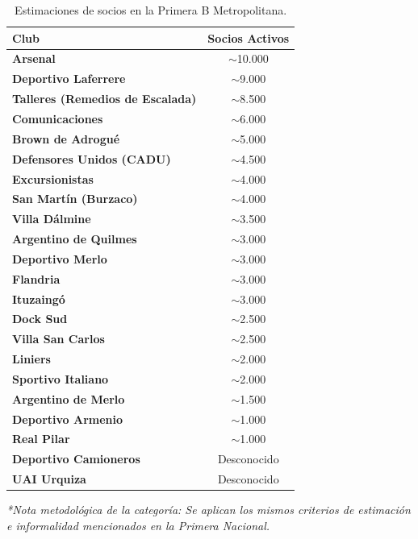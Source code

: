 \begin{table}[h!]
\centering
\renewcommand{\arraystretch}{1.1}
\begin{tabularx}{\textwidth}{|X|c|}
\hline
\rowcolor{gray!20} \textbf{Club} & \textbf{Socios Activos} \\ \hline
\textbf{Arsenal} & $\sim$10.000 \\ \hline
\textbf{Deportivo Laferrere} & $\sim$9.000 \\ \hline
\textbf{Talleres (Remedios de Escalada)} & $\sim$8.500 \\ \hline
\textbf{Comunicaciones} & $\sim$6.000 \\ \hline
\textbf{Brown de Adrogué} & $\sim$5.000 \\ \hline
\textbf{Defensores Unidos (CADU)} & $\sim$4.500 \\ \hline
\textbf{Excursionistas} & $\sim$4.000 \\ \hline
\textbf{San Martín (Burzaco)} & $\sim$4.000 \\ \hline
\textbf{Villa Dálmine} & $\sim$3.500 \\ \hline
\textbf{Argentino de Quilmes} & $\sim$3.000 \\ \hline
\textbf{Deportivo Merlo} & $\sim$3.000 \\ \hline
\textbf{Flandria} & $\sim$3.000 \\ \hline
\textbf{Ituzaingó} & $\sim$3.000 \\ \hline
\textbf{Dock Sud} & $\sim$2.500 \\ \hline
\textbf{Villa San Carlos} & $\sim$2.500 \\ \hline
\textbf{Liniers} & $\sim$2.000 \\ \hline
\textbf{Sportivo Italiano} & $\sim$2.000 \\ \hline
\textbf{Argentino de Merlo} & $\sim$1.500 \\ \hline
\textbf{Deportivo Armenio} & $\sim$1.000 \\ \hline
\textbf{Real Pilar} & $\sim$1.000 \\ \hline
\textbf{Deportivo Camioneros} & Desconocido \\ \hline
\textbf{UAI Urquiza} & Desconocido \\ \hline
\end{tabularx}
\caption{Estimaciones de socios en la Primera B Metropolitana.}
\label{tab:anexo_primera_b}
\end{table}

\textit{*Nota metodológica de la categoría: Se aplican los mismos criterios de estimación e informalidad mencionados en la Primera Nacional.}

